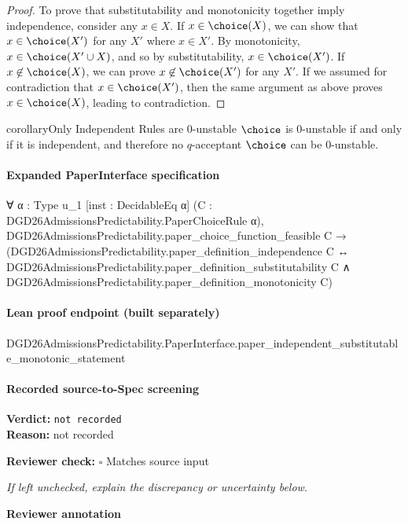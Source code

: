 \documentclass[10pt]{article}
\newcommand{\reviewerbox}{%
  \par\noindent\fbox{\parbox{0.96\linewidth}{\rule{0pt}{0.38in}}}\par
}
\newcommand{\reviewmatch}[1]{%
  \par\noindent\textbf{Reviewer check:} $\square$\; #1\par
  \noindent\emph{If left unchecked, explain the discrepancy or uncertainty below.}\par
}
\begin{document}
\begin{ReviewVerbatim}
\begin{proof}
    To prove that substitutability and monotonicity together imply independence, consider any $x \in X$. If $x \in \choice(X)$, we can show that $x \in \choice(X')$ for any $X'$ where $x \in X'$. By monotonicity, $x \in \choice(X' \cup X)$, and so by substitutability, $x \in \choice(X')$. If $x \not\in \choice(X)$, we can prove $x \not\in \choice(X')$ for any $X'$. If we assumed for contradiction that $x \in \choice(X')$, then the same argument as above proves $x \in \choice(X)$, leading to contradiction.
\end{proof}

\begin{restatable}{corollary}{Only Independent Rules are 0-unstable}
\label{thm:independent-zero-unstable}
$\choice$ is $0$-unstable if and only if it is independent, and therefore no $q$-acceptant $\choice$ can be $0$-unstable.
\end{restatable}
\end{ReviewVerbatim}


\paragraph{Expanded PaperInterface specification}
\begin{ReviewVerbatim}
∀ {α : Type u_1} [inst : DecidableEq α] (C : DGD26AdmissionsPredictability.PaperChoiceRule α),
  DGD26AdmissionsPredictability.paper_choice_function_feasible C →
    (DGD26AdmissionsPredictability.paper_definition_independence C ↔
      DGD26AdmissionsPredictability.paper_definition_substitutability C ∧
        DGD26AdmissionsPredictability.paper_definition_monotonicity C)
\end{ReviewVerbatim}

\paragraph{Lean proof endpoint (built separately)}\begin{ReviewVerbatim}
DGD26AdmissionsPredictability.PaperInterface.paper_independent_substitutable_monotonic_statement
\end{ReviewVerbatim}

\paragraph{Recorded source-to-Spec screening}
\textbf{Verdict:} \texttt{not recorded}
\\
\textbf{Reason:} not recorded
\reviewmatch{Matches source input}
\noindent\textbf{Reviewer annotation}\par
\reviewerbox
\clearpage
\hypertarget{source-claim-dac748564d615cb6}{}
\end{document}
